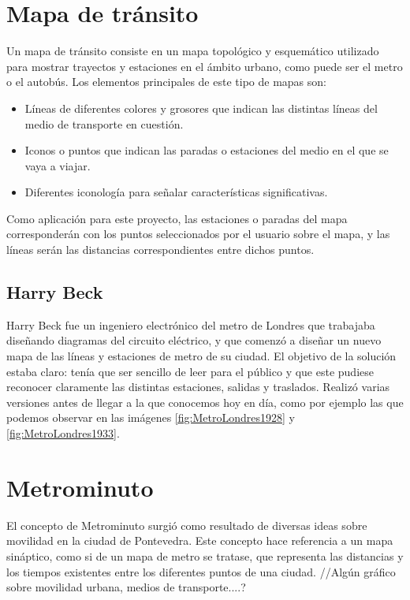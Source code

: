 

\section{Mapa de tránsito}
Un mapa de tránsito consiste en un mapa topológico y esquemático utilizado para mostrar trayectos y estaciones en el ámbito urbano, como puede ser el metro o el autobús. Los elementos principales de este tipo de mapas son:
\begin{itemize}
	\item Líneas de diferentes colores y grosores que indican las distintas líneas del medio de transporte en cuestión.
	\item Iconos o puntos que indican las paradas o estaciones del medio en el que se vaya a viajar.
	\item Diferentes iconología para señalar características significativas.
\end{itemize}
Como aplicación para este proyecto, las estaciones o paradas del mapa corresponderán con los puntos seleccionados por el usuario sobre el mapa, y las líneas serán las distancias correspondientes entre dichos puntos.

\subsection{Harry Beck}
Harry Beck fue un ingeniero electrónico del metro de Londres que trabajaba diseñando diagramas del circuito eléctrico, y que comenzó a diseñar un nuevo mapa de las líneas y estaciones de metro de su ciudad. El objetivo de la solución estaba claro: tenía que ser sencillo de leer para el público y que este pudiese reconocer claramente las distintas estaciones, salidas y traslados.
Realizó varias versiones antes de llegar a la que conocemos hoy en día, como por ejemplo las que podemos observar en las imágenes \ref{fig:MetroLondres1928} y \ref{fig:MetroLondres1933}.
\label{fig:MetroLondres1928}
\label{fig:MetroLondres1933}

\section{Metrominuto}
El concepto de Metrominuto surgió como resultado de diversas ideas sobre movilidad en la ciudad de Pontevedra. Este concepto hace referencia a un mapa sináptico, como si de un mapa de metro se tratase, que representa las distancias y los tiempos existentes entre los diferentes puntos de una ciudad. 
//Algún gráfico sobre movilidad urbana, medios de transporte....?

